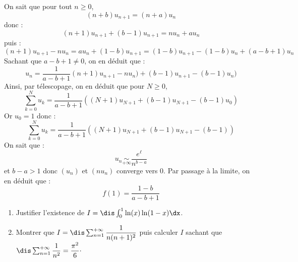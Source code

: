 \documentclass[a4paper,10pt]{report}
\begin{document}
\begin{corr}
\begin{enumerate}
\medskip

\noindent On sait que pour tout $n \geq 0$,
$$ (n+b) u_{n+1} = (n+a) u_n$$
donc :
$$ (n+1) u_{n+1} + (b-1) u_{n+1} = n u_n + au_n $$
puis :
$$ (n+1) u_{n+1}- n u_n = a u_n + (1-b) u_{n+1} = (1-b) u_{n+1} - (1-b) u_n +  (a-b+1) u_n$$
Sachant que $a-b+1 \neq 0$, on en déduit que :
$$ u_n = \dfrac{1}{a-b+1} (n+1) u_{n+1}- n u_n ) + (b-1) u_{n+1} - (b-1) u_n)$$
Ainsi, par télescopage, on en déduit que pour $N \geq 0$,
$$ \sum_{k=0}^N u_k = \dfrac{1}{a-b+1}  ( (N+1) u_{N+1} +(b-1) u_{N+1} - (b-1)u_0 )$$
Or $u_0=1$ donc : 
$$  \sum_{k=0}^N u_k = \dfrac{1}{a-b+1}  ( (N+1) u_{N+1} +(b-1) u_{N+1} - (b-1))$$
On sait que :
$$ u_n \underset{+ \infty}{\sim} \dfrac{e^{\ell}}{n^{b-a}}$$
et $b-a>1$ donc $(u_n)$ et $(nu_n)$ converge vers $0$. Par passage à la limite, on en déduit que :
$$ f(1) = \dfrac{1-b}{a-b+1}$$
\end{enumerate}
\end{corr}

\begin{Exa}
\begin{enumerate}
\item Justifier l'existence de $I= \dis \int_{0}^1 \ln(x) \ln(1-x) \dx$.
\item Montrer que $I =\dis \sum_{n=1}^{+ \infty} \dfrac{1}{n(n+1)^2}$ puis calculer $I$ sachant que $\dis \sum_{n=1}^{+ \infty} \dfrac{1}{n^2} = \dfrac{\pi^2}{6}\cdot$
\end{enumerate}
\end{Exa}
\end{document}
